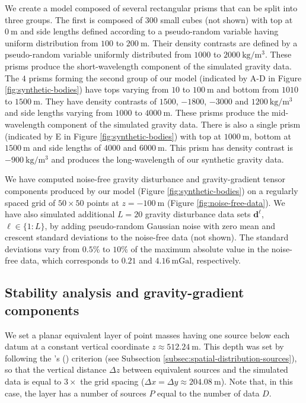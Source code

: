 We create a model composed of several rectangular prisms that can be split into three groups.
The first is composed of $300$ small cubes (not shown) with top at $0 \: \mathrm{m}$ and side lengths
defined according to a pseudo-random variable having uniform distribution from 
$100$ to $200 \: \mathrm{m}$.
Their density contrasts are defined by a pseudo-random variable uniformly distributed
from $1000$ to $2000 \: \mathrm{kg / m^{3}}$.
These prisms produce the short-wavelength component of the simulated gravity data.
The $4$ prisms forming the second group of our model (indicated by A-D in Figure \ref{fig:synthetic-bodies}) 
have tops varying from $10$ to $100 \: \mathrm{m}$ and bottom from $1010$ to $1500 \: \mathrm{m}$.
They have density contrasts of $1500$, $-1800$, $-3000$ and $1200  \: \mathrm{kg / m^{3}}$
and side lengths varying from $1000$ to $4000 \: \mathrm{m}$.
These prisms produce the mid-wavelength component of the simulated gravity data.
There is also a single prism (indicated by E in Figure \ref{fig:synthetic-bodies}) 
with top at $1000 \: \mathrm{m}$, bottom at 
$1500 \: \mathrm{m}$ and side lengths of $4000$ and $6000 \: \mathrm{m}$.
This prism has density contrast is $-900 \: \mathrm{kg / m^{3}}$ and produces the
long-wavelength of our synthetic gravity data.

We have computed noise-free gravity disturbance and gravity-gradient tensor components 
produced by our model (Figure \ref{fig:synthetic-bodies}) on a regularly spaced grid of $50 \times 50$ points at 
$z = -100 \: \mathrm{m}$ (Figure \ref{fig:noise-free-data}).
We have also simulated additional $L = 20$ gravity disturbance data sets $\mathbf{d}^{\ell}$, $\ell \in \{1:L\}$, 
by adding pseudo-random Gaussian noise with zero mean and crescent standard deviations to the noise-free data (not shown).
The standard deviations vary from $0.5\%$ to $10\%$ of the maximum absolute value in the noise-free data,
which corresponds to $0.21$ and $4.16 \: \mathrm{mGal}$, respectively.

\subsection{Stability analysis and gravity-gradient components}

We set a planar equivalent layer of point masses having one source below each datum at a constant vertical coordinate $z \approx 512.24 \: \mathrm{m}$.
This depth was set by following the \citeauthor{dampney1969}'s (\citeyear{dampney1969}) criterion (see Subsection \ref{subsec:spatial-distribution-sources}),
so that the vertical distance $\Delta z$ between equivalent sources and the simulated data is equal to $3 \times$ the grid spacing 
($\Delta x = \Delta y \approx 204.08 \: \mathrm{m} $).
Note that, in this case, the layer has a number of sources $P$ equal to the number of data $D$.

